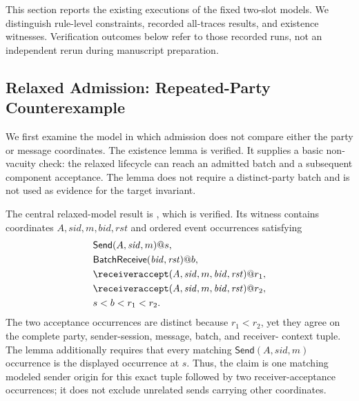 
This section reports the existing executions of the fixed two-slot models.
We distinguish rule-level constraints, recorded all-traces results, and
existence witnesses. Verification outcomes below refer to those recorded
runs, not an independent rerun during manuscript preparation.

\subsection{Relaxed Admission: Repeated-Party Counterexample}

We first examine the model in which admission does not compare either the
party or message coordinates. The existence lemma
 is verified. It supplies a
basic non-vacuity check: the relaxed lifecycle can reach an admitted batch and
a subsequent component acceptance. The lemma does not require a
distinct-party batch and is not used as evidence for the target invariant.

The central relaxed-model result is
, which is verified. Its witness
contains coordinates $A,\mathit{sid},m,\mathit{bid},\mathit{rst}$ and ordered
event occurrences satisfying
\begin{equation}
  \begin{aligned}
    &\mathsf{Send}(A,\mathit{sid},m)@s, \\
    &\mathsf{BatchReceive}(\mathit{bid},\mathit{rst})@b, \\
    &\receiveraccept(A,\mathit{sid},m,
       \mathit{bid},\mathit{rst})@r_1, \\
    &\receiveraccept(A,\mathit{sid},m,
       \mathit{bid},\mathit{rst})@r_2, \\
    &s < b < r_1 < r_2.
  \end{aligned}
  \label{eq:relaxed-duplicate-witness}
\end{equation}
The two acceptance occurrences are distinct because $r_1<r_2$, yet they
agree on the complete party, sender-session, message, batch, and receiver-
context tuple. The lemma additionally requires that every matching
\(\mathsf{Send}(A,\mathit{sid},m)\) occurrence is the displayed occurrence
at $s$. Thus, the claim is one matching modeled sender origin for this exact
tuple followed by two receiver-acceptance occurrences; it does not exclude
unrelated sends carrying other coordinates.

